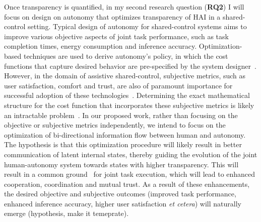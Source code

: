 \documentclass[12pt]{article}
\begin{document}
Once transparency is quantified, in my second research question (\textbf{RQ2}) I will focus on design on autonomy that optimizes transparency of HAI in a shared-control setting. Typical design of autonomy for shared-control systems aims to improve various objective aspects of joint task performance, such as task completion times, energy consumption and inference accuracy. Optimization-based techniques are used to derive autonomy's policy, in which the cost functions that capture desired behavior are pre-specified by the system designer~\cite{javdani2015shared}. However, in the domain of assistive shared-control, subjective metrics, such as user satisfaction, comfort and trust, are also of paramount importance for successful adoption of these technologies~\cite{kim2012autonomy}. Determining the exact mathematical structure for the cost function that incorporates these subjective metrics is likely an intractable problem~\cite{gopinath2017human}. In our proposed work, rather than focusing on the objective or subjective metrics independently, we intend to focus on the optimization of bi-directional information flow between human and autonomy. The hypothesis is that this optimization procedure will likely result in better communication of latent internal states, thereby guiding the evolution of the joint human-autonomy system towards states with higher transparency. This will result in a common ground~\cite{kiesler2005fostering} for joint task execution, which will lead to enhanced cooperation, coordination and mutual trust. As a result of these enhancements, the desired objective and subjective outcomes (improved task performance, enhanced inference accuracy, higher user satisfaction \textit{et cetera}) will naturally emerge (hypothesis, make it temeprate).
\end{document}
